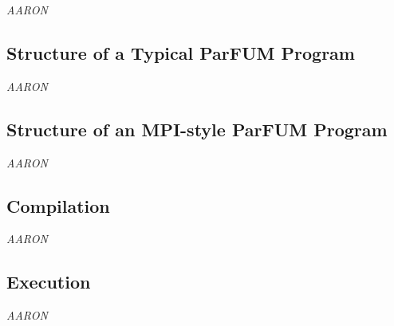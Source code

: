 {\it AARON}


\subsection{Structure of a Typical ParFUM Program}

{\it AARON}

\subsection{Structure of an MPI-style ParFUM Program}

{\it AARON}

\subsection{Compilation}

{\it AARON}

\subsection{Execution}

{\it AARON}

